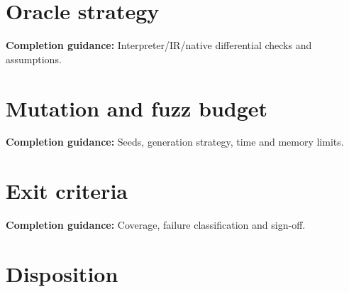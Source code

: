 \documentclass[10pt,letterpaper]{article}
\begin{document}
\section{Oracle strategy}
\textbf{Completion guidance:} Interpreter/IR/native differential checks and assumptions.\par\medskip{}
\section{Mutation and fuzz budget}
\textbf{Completion guidance:} Seeds, generation strategy, time and memory limits.\par\medskip{}
\section{Exit criteria}
\textbf{Completion guidance:} Coverage, failure classification and sign-off.\par\medskip{}
\section{Disposition}
\end{document}
